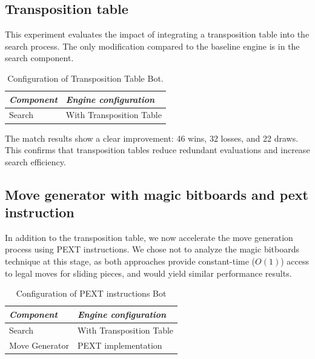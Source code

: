 \subsection*{Transposition table}
\label{sec:tt}

\noindent This experiment evaluates the impact of integrating a transposition table into the search process. The only modification compared to the baseline engine is in the search component.

\vspace{0.5em}

\begin{table}[H]
    \centering
    \begin{tabular}{|p{4cm}|p{6cm}|}
    \hline
    \textit{Component}         & \textit{Engine configuration}            \\ \hline
    Search                     & With Transposition Table \\ \hline
    \end{tabular}
    \caption*{Configuration of Transposition Table Bot.}
    \label{tab:tt_vs_basic}
\end{table}

\begin{center}
\medskip
\end{center}

\noindent The match results show a clear improvement: 46 wins, 32 losses, and 22 draws. This confirms that transposition tables reduce redundant evaluations and increase search efficiency.

\subsection*{Move generator with magic bitboards and pext instruction}

\noindent In addition to the transposition table, we now accelerate the move generation process using PEXT instructions. We chose not to analyze the magic bitboards technique at this stage, as both approaches provide constant-time (\( O(1) \)) access to legal moves for sliding pieces, and would yield similar performance results.

\vspace{1em}

\begin{table}[H]
    \centering
    \begin{tabular}{|p{4cm}|p{6cm}|}
    \hline
    \textit{Component}         & \textit{Engine configuration}    \\ \hline
    Search                     & With Transposition Table                     \\ \hline
    Move Generator             & PEXT implementation                \\ \hline
    \end{tabular}
    \caption*{Configuration of PEXT instructions Bot}\label{tab:pext_vs_basic}
\end{table}

